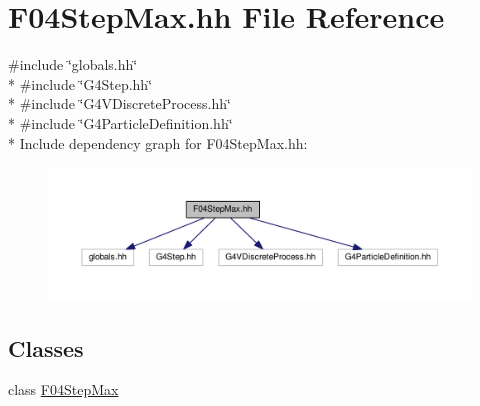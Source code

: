 \hypertarget{F04StepMax_8hh}{}\section{F04\+Step\+Max.\+hh File Reference}
\label{F04StepMax_8hh}
{\ttfamily \#include \char`\"{}globals.\+hh\char`\"{}}\\*
{\ttfamily \#include \char`\"{}G4\+Step.\+hh\char`\"{}}\\*
{\ttfamily \#include \char`\"{}G4\+V\+Discrete\+Process.\+hh\char`\"{}}\\*
{\ttfamily \#include \char`\"{}G4\+Particle\+Definition.\+hh\char`\"{}}\\*
Include dependency graph for F04\+Step\+Max.\+hh\+:
\nopagebreak
\begin{figure}[H]
\begin{center}
\leavevmode
\includegraphics[width=350pt]{F04StepMax_8hh__incl}
\end{center}
\end{figure}
\subsection*{Classes}
\begin{DoxyCompactItemize}
\item 
class \hyperlink{classF04StepMax}{F04\+Step\+Max}
\end{DoxyCompactItemize}
